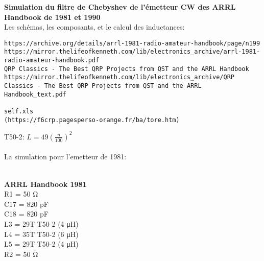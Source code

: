 \documentclass[a4paper]{article}
\def\plotscale{0.7}
\begin{document}
\textbf{Simulation du filtre de Chebyshev de
l'émetteur CW des ARRL Handbook de 1981 et 1990}\\

Les schémas, les composants, et le calcul des inductances:\\
\scriptsize
\begin{verbatim}
https://archive.org/details/arrl-1981-radio-amateur-handbook/page/n199
https://mirror.thelifeofkenneth.com/lib/electronics_archive/arrl-1981-radio-amateur-handbook.pdf
QRP Classics - The Best QRP Projects from QST and the ARRL Handbook
https://mirror.thelifeofkenneth.com/lib/electronics_archive/QRP Classics - The Best QRP Projects from QST and the ARRL Handbook_text.pdf

self.xls
(https://f6crp.pagesperso-orange.fr/ba/tore.htm)
\end{verbatim}
\normalsize
T50-2: $L = 49 (\frac{n}{100})^2$\\
\\
La simulation pour l'emetteur de 1981:\\
\\
\hspace{5mm}
\begin{minipage}[b]{10cm}
\textbf{ARRL Handbook 1981}\\
R1 = 50 \si{\ohm}\\
C17 = 820 \si{\pico\farad}\\
C18 = 820 \si{\pico\farad}\\
L3 = 29T T50-2 (4 \si{\micro\henry})\\
L4 = 35T T50-2 (6 \si{\micro\henry})\\
L5 = 29T T50-2 (4 \si{\micro\henry})\\
R2 = 50 \si{\ohm}\\

\end{minipage}\\
\\
\end{document}
